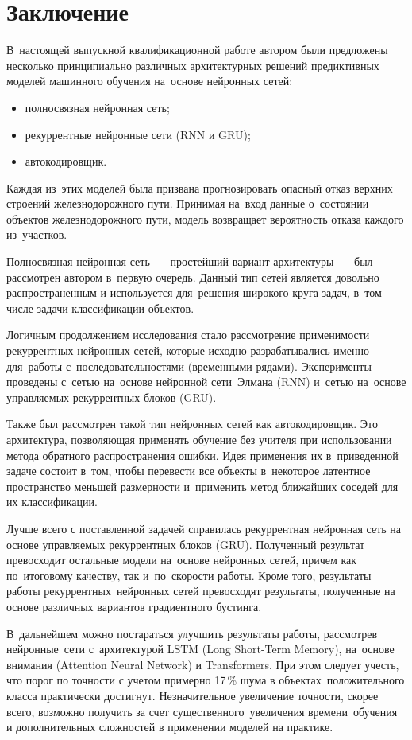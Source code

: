 \chapter*{Заключение}

В~настоящей выпускной квалификационной работе автором были предложены несколько принципиально различных архитектурных решений
предиктивных моделей машинного обучения на~основе нейронных сетей:
\begin{itemize}[noitemsep, topsep=-.5\parskip, leftmargin=!]
	\item полносвязная нейронная сеть;
	\item рекуррентные нейронные сети (RNN и GRU);
	\item автокодировщик.
\end{itemize}

\vspace{.5\parskip}
Каждая из~этих моделей была призвана прогнозировать опасный отказ верхних строений железнодорожного пути.\linebreak
Принимая на~вход данные о~состоянии объектов железнодорожного пути, модель возвращает вероятность отказа каждого из~участков.

Полносвязная нейронная сеть~--- простейший вариант архитектуры~--- был рассмотрен автором в~первую очередь.
Данный тип сетей является довольно распространенным и используется для~решения широкого круга задач, в~том числе задачи классификации объектов.

Логичным продолжением исследования стало рассмотрение применимости рекуррентных нейронных сетей, 
которые исходно разрабатывались именно для~работы с~последовательностями (временными рядами).
Эксперименты проведены с~сетью на~основе нейронной сети~Элмана (RNN)
и~сетью на~основе управляемых рекуррентных блоков (GRU).

Также был рассмотрен такой тип нейронных сетей как автокодировщик.
Это архитектура, позволяющая применять обучение без учителя
при использовании метода обратного распространения ошибки.
Идея применения их в~приведенной задаче состоит в~том, чтобы перевести
все объекты в~некоторое латентное пространство меньшей размерности и~применить
метод ближайших соседей для их классификации.

Лучше всего с поставленной задачей справилась рекуррентная нейронная сеть на основе управляемых рекуррентных блоков (GRU).
Полученный результат превосходит остальные модели на~основе нейронных сетей, причем как по~итоговому качеству, так и~по~скорости работы.
Кроме того, результаты работы рекуррентных нейронных сетей превосходят результаты,
полученные на основе различных вариантов градиентного бустинга.

В~дальнейшем можно постараться улучшить результаты работы,
рассмотрев нейронные сети с~архитектурой LSTM (Long Short-Term Memory),
на~основе внимания (Attention Neural Network) и Transformers.
При этом следует учесть, что порог по точности
с учетом примерно 17\,\% шума в объектах положительного класса
практически достигнут.
Незначительное увеличение точности, скорее всего, возможно получить
за счет существенного увеличения времени обучения
и дополнительных сложностей в применении моделей на практике.
